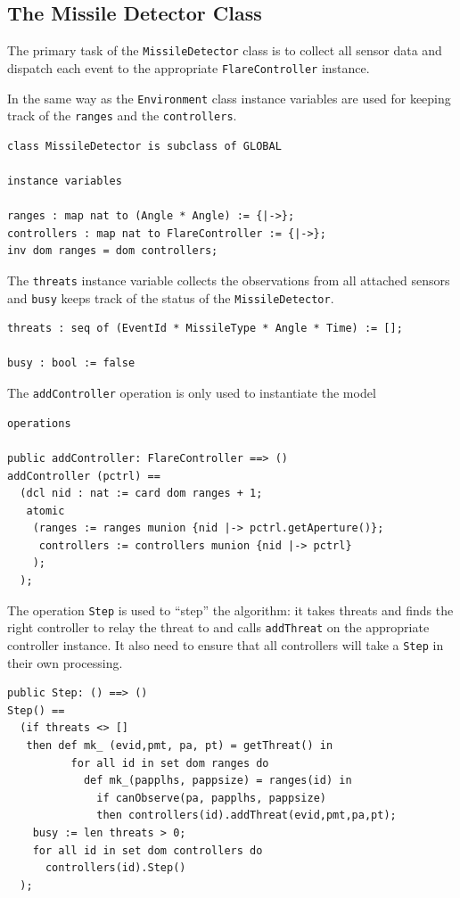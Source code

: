 \documentclass{overturerepchap}
\begin{document}
\subsection{The Missile Detector Class}

The primary task of the \texttt{MissileDetector} class is to
collect all sensor data and dispatch each event
to the appropriate \texttt{FlareController} instance.

In the same way as the \texttt{Environment} class instance variables are 
used for keeping track of the \texttt{ranges} and the \texttt{controllers}.

\begin{lstlisting}
class MissileDetector is subclass of GLOBAL

instance variables

ranges : map nat to (Angle * Angle) := {|->};
controllers : map nat to FlareController := {|->};
inv dom ranges = dom controllers;
\end{lstlisting}

The \texttt{threats} instance variable collects the observations from 
all attached sensors and \texttt{busy} keeps track of the status of
the \texttt{MissileDetector}.

\begin{lstlisting}
threats : seq of (EventId * MissileType * Angle * Time) := [];

busy : bool := false
\end{lstlisting}

The \texttt{addController} operation is only used to instantiate the model

\begin{lstlisting}
operations

public addController: FlareController ==> ()
addController (pctrl) ==
  (dcl nid : nat := card dom ranges + 1;
   atomic
    (ranges := ranges munion {nid |-> pctrl.getAperture()};
     controllers := controllers munion {nid |-> pctrl}
    );
  );
\end{lstlisting}

The operation \texttt{Step} is used to ``step'' the algorithm: it
takes threats and finds the right controller to relay the threat to
and calls \texttt{addThreat} on the appropriate controller instance. It 
also need to ensure that all controllers will take a \texttt{Step} in their
own processing.

\begin{lstlisting}
public Step: () ==> ()
Step() ==
  (if threats <> []
   then def mk_ (evid,pmt, pa, pt) = getThreat() in
          for all id in set dom ranges do
            def mk_(papplhs, pappsize) = ranges(id) in
              if canObserve(pa, papplhs, pappsize)
              then controllers(id).addThreat(evid,pmt,pa,pt);
    busy := len threats > 0;
    for all id in set dom controllers do
      controllers(id).Step()
  );
\end{lstlisting}
\end{document}
